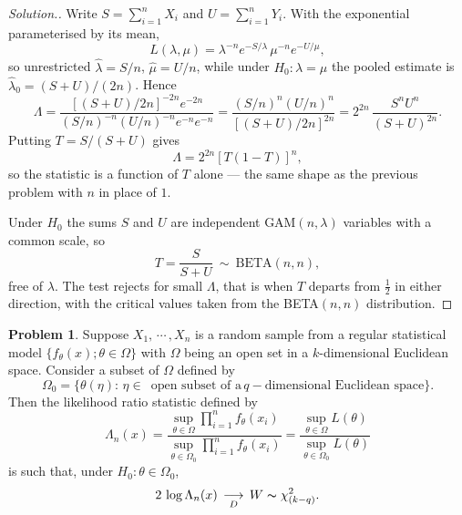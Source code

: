 \documentclass[12pt,a4paper]{report}
\theoremstyle{definition}
\newtheorem{problemx}{Problem}[section]
\newenvironment{problem}{\begin{problemx}}{\end{problemx}}
\newenvironment{solution}
  {\renewcommand{\qedsymbol}{}\begin{proof}[\textit{Solution}.]}
  {\end{proof}}
\begin{document}
\begin{solution}
Write $S=\sum_{i=1}^{n}X_i$ and $U=\sum_{i=1}^{n}Y_i$. With the exponential
parameterised by its mean,
\[L(\lambda,\mu) = \lambda^{-n}e^{-S/\lambda}\,\mu^{-n}e^{-U/\mu},\]
so unrestricted $\widehat{\lambda}=S/n$, $\widehat{\mu}=U/n$, while under
$H_0:\lambda=\mu$ the pooled estimate is $\widehat{\lambda}_0=(S+U)/(2n)$.
Hence
\[\Lambda = \frac{\left[(S+U)/2n\right]^{-2n}e^{-2n}}
{\left(S/n\right)^{-n}\left(U/n\right)^{-n}e^{-n}e^{-n}}
= \frac{\left(S/n\right)^{n}\left(U/n\right)^{n}}{\left[(S+U)/2n\right]^{2n}}
= 2^{2n}\,\frac{S^{n}U^{n}}{(S+U)^{2n}} .\]
Putting $T = S/(S+U)$ gives
\[\Lambda = 2^{2n}\left[T(1-T)\right]^{n},\]
so the statistic is a function of $T$ alone --- the same shape as the previous
problem with $n$ in place of $1$.

Under $H_0$ the sums $S$ and $U$ are independent GAM$(n,\lambda)$ variables with
a common scale, so
\[T = \frac{S}{S+U}\ \sim\ \text{BETA}(n,n),\]
free of $\lambda$. The test rejects for small $\Lambda$, that is when $T$ departs
from $\tfrac12$ in either direction, with the critical values taken from the
BETA$(n,n)$ distribution.
\end{solution}

\begin{problem}
\label{prob:wilks}
Suppose $X_1, \, \cdots\, , X_n$  is a random sample from a regular statistical model $\{f_{\theta}(x); \theta \in \Omega\}$ with $\Omega$ being an open set in a $k$-dimensional Euclidean space. Consider a subset of $\Omega$ defined by \[\Omega_0 = \{\theta(\eta):\, \eta \in \, \text{ open subset of  a}\, q-\text{dimensional Euclidean space}\}.\]
Then the likelihood ratio statistic defined by 
\[\Lambda_n(x) = \frac{\sup_{\theta\in \Omega} \prod^n_{i = 1} f_{\theta}(x_i)}{\sup_{\theta\in \Omega_0} \prod^n_{i =1} f_{\theta}(x_i)} = \frac{\sup_{\theta\in \Omega}L(\theta)}{\sup_{\theta\in \Omega_0} L(\theta)}\]
is such that, under $H_0: \theta \in \Omega_0$,
\[2\, \log \Lambda_n(x) \, \underset{D}{\longrightarrow} \, W\thicksim \chi^2_{(k - q)}.\]
\end{problem}
\end{document}
